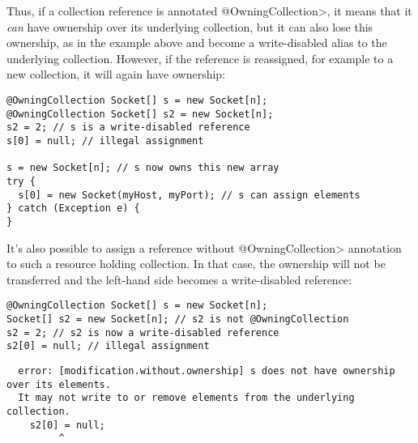 Thus, if a collection reference is annotated \<@OwningCollection>, it means that it \textit{can} have ownership over its underlying collection, but it can also lose this ownership, as in the example above and become a write-disabled alias to the underlying collection.
However, if the reference is reassigned, for example to a new collection, it will again have ownership:

\begin{verbatim}
@OwningCollection Socket[] s = new Socket[n];
@OwningCollection Socket[] s2 = new Socket[n];
s2 = 2; // s is a write-disabled reference
s[0] = null; // illegal assignment

s = new Socket[n]; // s now owns this new array
try {
  s[0] = new Socket(myHost, myPort); // s can assign elements
} catch (Exception e) {
}
\end{verbatim}

It's also possible to assign a reference without \<@OwningCollection> annotation to such a resource holding collection. In that case, the ownership will not be transferred and the left-hand side becomes a write-disabled reference:

\begin{Verbatim}
@OwningCollection Socket[] s = new Socket[n];
Socket[] s2 = new Socket[n]; // s2 is not @OwningCollection
s2 = 2; // s2 is now a write-disabled reference
s2[0] = null; // illegal assignment
\end{Verbatim}

\begin{Verbatim}
  error: [modification.without.ownership] s does not have ownership over its elements.
  It may not write to or remove elements from the underlying collection.
    s2[0] = null;
         ^
\end{Verbatim}

